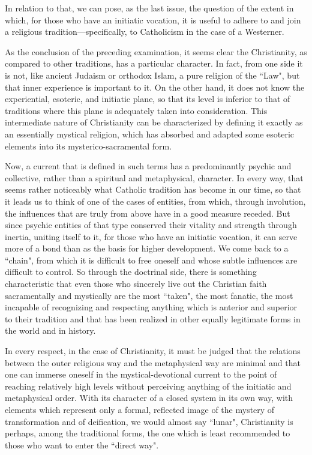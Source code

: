 In relation to that, we can pose, as the last issue, the question of the extent in which, for those who have an initiatic vocation, it is useful to adhere to and join a religious tradition—specifically, to Catholicism in the case of a Westerner.

As the conclusion of the preceding examination, it seems clear the Christianity, as compared to other traditions, has a particular character. In fact, from one side it is not, like ancient Judaism or orthodox Islam, a pure religion of the ``Law", but that inner experience is important to it. On the other hand, it does not know the experiential, esoteric, and initiatic plane, so that its level is inferior to that of traditions where this plane is adequately taken into consideration. This intermediate nature of Christianity can be characterized by defining it exactly as an essentially mystical religion, which has absorbed and adapted some esoteric elements into its mysterico-sacramental form.

Now, a current that is defined in such terms has a predominantly psychic and collective, rather than a spiritual and metaphysical, character. In every way, that seems rather noticeably what Catholic tradition has become in our time, so that it leads us to think of one of the cases of entities, from which, through involution, the influences that are truly from above have in a good measure receded. But since psychic entities of that type conserved their vitality and strength through inertia, uniting itself to it, for those who have an initiatic vocation, it can serve more of a bond than as the basis for higher development. We come back to a ``chain", from which it is difficult to free oneself and whose subtle influences are difficult to control. So through the doctrinal side, there is something characteristic that even those who sincerely live out the Christian faith sacramentally and mystically are the most ``taken", the most fanatic, the most incapable of recognizing and respecting anything which is anterior and superior to their tradition and that has been realized in other equally legitimate forms in the world and in history.

In every respect, in the case of Christianity, it must be judged that the relations between the outer religious way and the metaphysical way are minimal and that one can immerse oneself in the mystical-devotional current to the point of reaching relatively high levels without perceiving anything of the initiatic and metaphysical order. With its character of a closed system in its own way, with elements which represent only a formal, reflected image of the mystery of transformation and of deification, we would almost say ``lunar", Christianity is perhaps, among the traditional forms, the one which is least recommended to those who want to enter the ``direct way".

